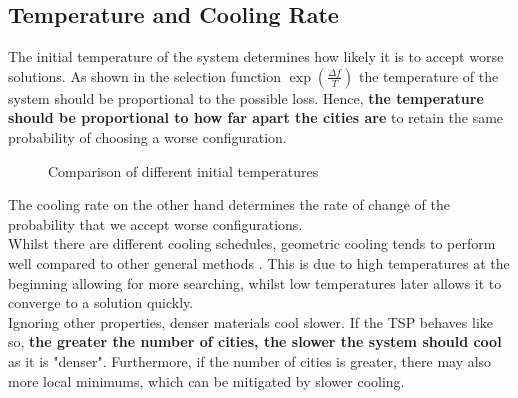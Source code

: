 \documentclass{article}
\begin{document}
\subsection{Temperature and Cooling Rate}

The initial temperature of the system determines how likely it is to accept worse solutions.
As shown in the selection function $\exp(\frac{\Delta f}{T})$ the temperature of the system should be proportional to the possible loss.
Hence, \textbf{the temperature should be proportional to how far apart the cities are} to retain the same probability of choosing a worse configuration.

\begin{figure}[H]
    \centering
    \caption{Comparison of different initial temperatures}
\end{figure}


The cooling rate on the other hand determines the rate of change of the probability that we accept worse configurations.
\\

Whilst there are different cooling schedules, geometric cooling tends to perform well compared to other general methods \cite{cooling}.
This is due to high temperatures at the beginning allowing for more searching, whilst low temperatures later allows it to converge to a solution quickly.
\\

Ignoring other properties, denser materials cool slower.
If the TSP behaves like so, \textbf{the greater the number of cities, the slower the system should cool} as it is "denser".
Furthermore, if the number of cities is greater, there may also more local minimums, which can be mitigated by slower cooling.
\end{document}
